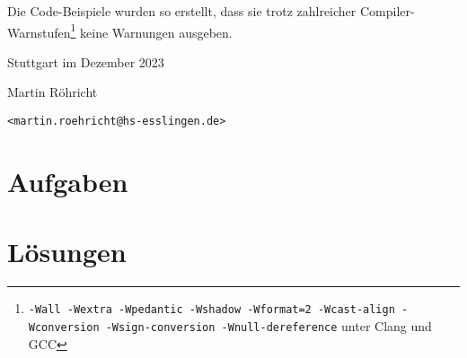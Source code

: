 \documentclass{coding-exercises}
\begin{document}
Die Code-Beispiele wurden so erstellt, dass sie trotz zahlreicher
Compiler-Warnstufen\footnote{\texttt{-Wall -Wextra -Wpedantic -Wshadow
-Wformat=2 -Wcast-align -Wconversion -Wsign-conversion -Wnull-dereference} unter
Clang und GCC} keine Warnungen ausgeben.

\begin{flushright}
    Stuttgart im Dezember 2023\par
    Martin Röhricht\par
    \texttt{<martin.roehricht@hs-esslingen.de>}
\end{flushright}

\tableofcontents

\mainmatter
\part{Aufgaben}



\setcounter{chapter}{0} %
\part{Lösungen}




\backmatter
\end{document}
